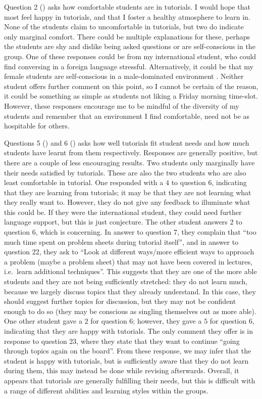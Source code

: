 Question 2 () asks how comfortable students are in tutorials. I would hope that most feel happy in tutorials, and that I foster a healthy atmosphere to learn in. None of the students claim to uncomfortable in tutorials, but two do indicate only marginal comfort. There could be multiple explanations for these, perhaps the students are shy and dislike being asked questions or are self-conscious in the group. One of these responses could be from my international student, who could find conversing in a foreign language stressful. Alternatively, it could be that my female students are self-conscious in a male-dominated environment \citep{Gonsalves2014,Gonsalves2014a}. Neither student offers further comment on this point, so I cannot be certain of the reason, it could be something as simple as students not liking a Friday morning time-slot. However, these responses encourage me to be mindful of the diversity of my students and remember that an environment I find comfortable, need not be as hospitable for others.

Questions 5 () and 6 () asks how well tutorials fit student needs and how much students have learnt from them respectively. Responses are generally positive, but there are a couple of less encouraging results. Two students only marginally have their needs satisfied by tutorials. These are also the two students who are also least comfortable in tutorial. One responded with a $4$ to question 6, indicating that they are learning from tutorials; it may be that they are not learning what they really want to. However, they do not give any feedback to illuminate what this could be. If they were the international student, they could need further language support, but this is just conjecture. The other student answers $2$ to question 6, which is concerning. In answer to question 7, they complain that ``too much time spent on problem sheets during tutorial itself'', and in answer to question 22, they ask to ``Look at different ways/more efficient ways to approach a problem (maybe a problem sheet) that may not have been covered in lectures, i.e.\ learn additional techniques''. This suggests that they are one of the more able students and they are not being sufficiently stretched: they do not learn much, because we largely discuss topics that they already understand. In this case, they should suggest further topics for discussion, but they may not be confident enough to do so (they may be conscious as singling themselves out as more able). One other student gave a $2$ for question 6; however, they gave a $5$ for question 6, indicating that they are happy with tutorials. The only comment they offer is in response to question 23, where they state that they want to continue ``going through topics again on the board''. From these response, we may infer that the student is happy with tutorials, but is sufficiently aware that they do not learn during them, this may instead be done while revising afterwards. Overall, it appears that tutorials are generally fulfilling their needs, but this is difficult with a range of different abilities and learning styles within the groups.

